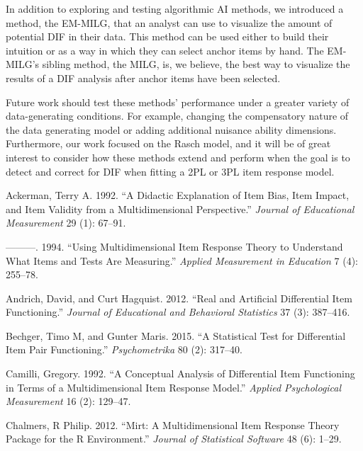 \documentclass[
  11pt,
]{article}
\begin{document}
In addition to exploring and testing algorithmic AI methods, we introduced a method, the EM-MILG, that an analyst can use to visualize the amount of potential DIF in their data. This method can be used either to build their intuition or as a way in which they can select anchor items by hand. The EM-MILG's sibling method, the MILG, is, we believe, the best way to visualize the results of a DIF analysis after anchor items have been selected.

Future work should test these methods' performance under a greater variety of data-generating conditions. For example, changing the compensatory nature of the data generating model or adding additional nuisance ability dimensions. Furthermore, our work focused on the Rasch model, and it will be of great interest to consider how these methods extend and perform when the goal is to detect and correct for DIF when fitting a 2PL or 3PL item response model.

\clearpage




\hypertarget{refs}{}
\leavevmode\hypertarget{ref-ackerman1992didactic}{}%
Ackerman, Terry A. 1992. ``A Didactic Explanation of Item Bias, Item Impact, and Item Validity from a Multidimensional Perspective.'' \emph{Journal of Educational Measurement} 29 (1): 67--91.

\leavevmode\hypertarget{ref-ackerman1994using}{}%
---------. 1994. ``Using Multidimensional Item Response Theory to Understand What Items and Tests Are Measuring.'' \emph{Applied Measurement in Education} 7 (4): 255--78.

\leavevmode\hypertarget{ref-andrich2012real}{}%
Andrich, David, and Curt Hagquist. 2012. ``Real and Artificial Differential Item Functioning.'' \emph{Journal of Educational and Behavioral Statistics} 37 (3): 387--416.

\leavevmode\hypertarget{ref-bechger2015statistical}{}%
Bechger, Timo M, and Gunter Maris. 2015. ``A Statistical Test for Differential Item Pair Functioning.'' \emph{Psychometrika} 80 (2): 317--40.

\leavevmode\hypertarget{ref-camilli1992conceptual}{}%
Camilli, Gregory. 1992. ``A Conceptual Analysis of Differential Item Functioning in Terms of a Multidimensional Item Response Model.'' \emph{Applied Psychological Measurement} 16 (2): 129--47.

\leavevmode\hypertarget{ref-chalmers2012mirt}{}%
Chalmers, R Philip. 2012. ``Mirt: A Multidimensional Item Response Theory Package for the R Environment.'' \emph{Journal of Statistical Software} 48 (6): 1--29.
\end{document}
